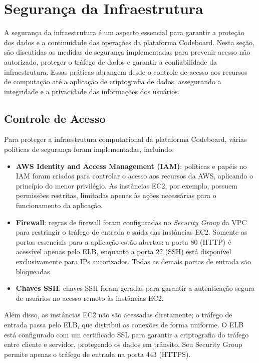 \section{Segurança da Infraestrutura}

A segurança da infraestrutura é um aspecto essencial para garantir a proteção dos dados e a continuidade das operações da plataforma Codeboard. Nesta seção, são discutidas as medidas de segurança implementadas para prevenir acesso não autorizado, proteger o tráfego de dados e garantir a confiabilidade da infraestrutura. Essas práticas abrangem desde o controle de acesso aos recursos de computação até a aplicação de criptografia de dados, assegurando a integridade e a privacidade das informações dos usuários. 

\subsection{Controle de Acesso}

Para proteger a infraestrutura computacional da plataforma Codeboard, várias políticas de segurança foram implementadas, incluindo:

\begin{itemize}
    \item \textbf{AWS Identity and Access Management (IAM)}: políticas e papéis no IAM foram criados para controlar o acesso aos recursos da AWS, aplicando o princípio do menor privilégio. As instâncias EC2, por exemplo, possuem permissões restritas, limitadas apenas às ações necessárias para o funcionamento da aplicação.
    \item \textbf{Firewall}: regras de firewall foram configuradas no \emph{Security Group} da VPC para restringir o tráfego de entrada e saída das instâncias EC2. Somente as portas essenciais para a aplicação estão abertas: a porta 80 (HTTP) é acessível apenas pelo ELB, enquanto a porta 22 (SSH) está disponível exclusivamente para IPs autorizados. Todas as demais portas de entrada são bloqueadas.
    \item \textbf{Chaves SSH}: chaves SSH foram geradas para garantir a autenticação segura de usuários no acesso remoto às instâncias EC2.
\end{itemize}

Além disso, as instâncias EC2 não são acessadas diretamente; o tráfego de entrada passa pelo ELB, que distribui as conexões de forma uniforme. O ELB está configurado com um certificado SSL para garantir a criptografia do tráfego entre cliente e servidor, protegendo os dados em trânsito. Seu Security Group permite apenas o tráfego de entrada na porta 443 (HTTPS).

